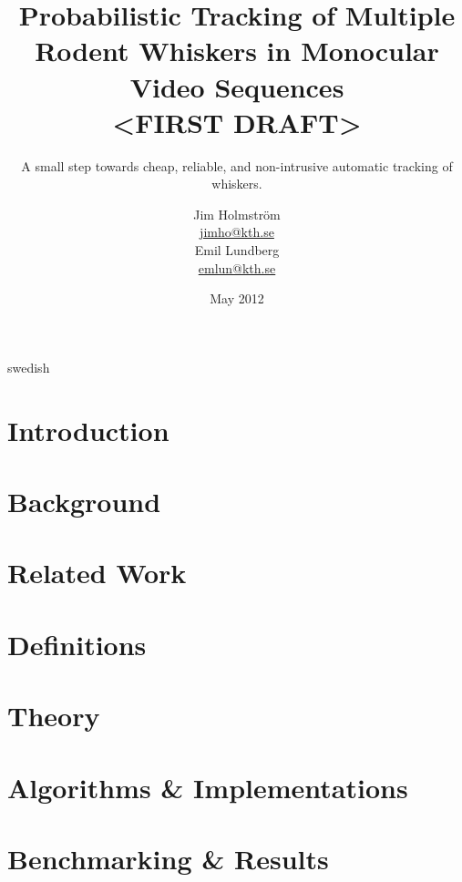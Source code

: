 \documentclass[a4paper,11pt]{kth-mag}
\title{
    Probabilistic Tracking of Multiple Rodent Whiskers in Monocular Video
    Sequences\\ <FIRST DRAFT>
}
\subtitle{
    A small step towards cheap, reliable, and non-intrusive automatic tracking of whiskers.
}
\author{
    Jim Holmström\\
    \href{mailto:jimho@kth.se}{jimho@kth.se}\\
    Emil Lundberg\\
    \href{mailto:emlun@kth.se}{emlun@kth.se}
}
\date{May 2012}
\theoremstyle{definition}
\begin{document}
\frontmatter
\pagestyle{empty}
\removepagenumbers
\maketitle
{}
\begin{abstract}
    
\end{abstract}
\clearpage
\begin{foreignabstract}{swedish}
    
\end{foreignabstract}
\clearpage
\tableofcontents*
\mainmatter
\pagestyle{newchap}
\chapter{Introduction}
    \label{sec:introduction}
    

\chapter{Background}
    \label{sec:Background}
    

\chapter{Related Work}
    \label{sec:related_work}
    

\chapter{Definitions}
    \label{sec:definitions}
    

\chapter{Theory}
    \label{sec:theory}
    


\chapter{Algorithms \& Implementations}
    \label{sec:algorithms_implementations}
    


\chapter{Benchmarking \& Results}
    \label{sec:benchmarks_results}
    
\end{document}
